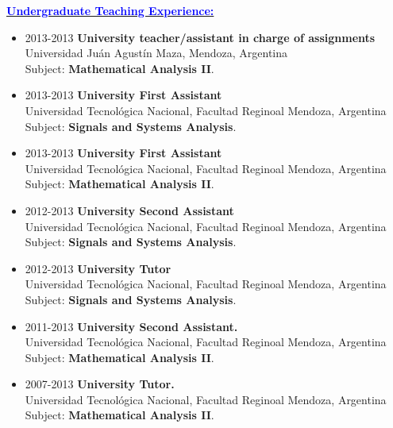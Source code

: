 \documentclass{article}
\newcommand{\statement}[1]{\par\medskip
  \underline{\textcolor{blue}{\textbf{#1:}}}\space
}
\begin{document}
\statement{Undergraduate Teaching Experience}
\begin{itemize}
	\item 2013-2013 {\bf University teacher/assistant in charge of assignments}\\
Universidad Ju\'an Agust\'in Maza, Mendoza, Argentina\\
Subject: \textbf{Mathematical Analysis II}.

	\item 2013-2013 {\bf University First Assistant}\\
Universidad Tecnol\'ogica Nacional, Facultad Reginoal Mendoza, Argentina\\
Subject: \textbf{Signals and Systems Analysis}.

	\item 2013-2013 {\bf University First Assistant}\\
Universidad Tecnol\'ogica Nacional, Facultad Reginoal Mendoza, Argentina\\
Subject: \textbf{Mathematical Analysis II}.

	\item 2012-2013 {\bf University Second Assistant}\\
Universidad Tecnol\'ogica Nacional, Facultad Reginoal Mendoza, Argentina\\
Subject: \textbf{Signals and Systems Analysis}.

	\item 2012-2013 {\bf University Tutor}\\
Universidad Tecnol\'ogica Nacional, Facultad Reginoal Mendoza, Argentina\\
Subject: \textbf{Signals and Systems Analysis}.

	\item 2011-2013 {\bf University Second Assistant.}\\
Universidad Tecnol\'ogica Nacional, Facultad Reginoal Mendoza, Argentina\\
Subject: \textbf{Mathematical Analysis II}.

	\item 2007-2013 {\bf University Tutor.}\\
Universidad Tecnol\'ogica Nacional, Facultad Reginoal Mendoza, Argentina\\
Subject: \textbf{Mathematical Analysis II}.

\end{itemize}
 
\newpage


\end{document}
